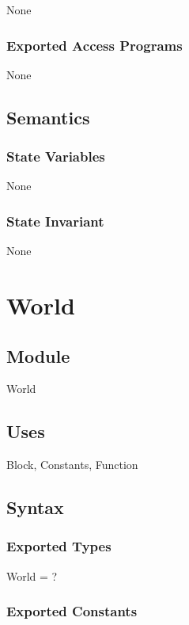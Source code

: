 \documentclass[12pt]{article}
\begin{document}
None

\subsubsection* {Exported Access Programs}

None

\subsection* {Semantics}

\subsubsection* {State Variables}

None

\subsubsection* {State Invariant}

None

\newpage

\section* {World}

\subsection* {Module}

World

\subsection* {Uses}

Block, Constants, Function

\subsection* {Syntax}

\subsubsection* {Exported Types}

World = ?

\subsubsection* {Exported Constants}
\end{document}
